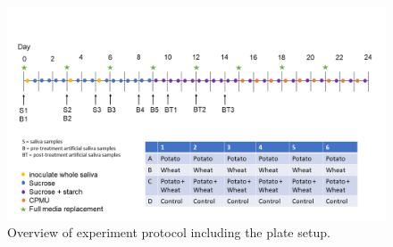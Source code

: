 \documentclass[utf8]{../templates/frontiersSCNS}
\begin{document}
\begin{figure}[H]

{\centering \includegraphics[width=0.7\linewidth]{../figures/protocol_overview} 

}

\caption{Overview of experiment protocol including the plate setup.}\label{fig:protocol-fig}
\end{figure}
\end{document}
